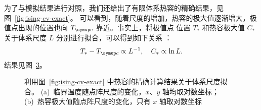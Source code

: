 为了与模拟结果进行对照，我们还给出了有限体系热容的精确结果，见图~\ref{fig:ising-cv-exact}。
可以看到，随着尺度的增加，热容的极大值逐渐增大，极值点出现的位置也向 $\Tc$ 靠近。事实上，将极值点
位置 $T_*$ 和热容极大值 $C_*$ 关于体系尺度 $L$ 分别进行拟合，可以得到如下关系 \cite{pathria}：
\begin{equation}
  T_* - \Tc \propto L^{-1} \qc
  C_*       \propto \ln L.
\end{equation}
结果见图~\ref{fig:ising-fit}。

\begin{figure}[htb]
  \begin{subfigure}[b]{0.48\textwidth}
    \hfill
    \label{fig:ising-cv-fit-i}
  \end{subfigure}
  \begin{subfigure}[b]{0.48\textwidth}
    \hfill
    \label{fig:ising-cv-fit-ii}
  \end{subfigure}
  \caption{利用图~\ref{fig:ising-cv-exact} 中热容的精确计算结果关于体系尺度拟合。
    (a)~临界温度随点阵尺度的变化，$x$、$y$ 轴均取对数坐标；
    (b)~热容极大值随点阵尺度的变化，只有 $x$ 轴取对数坐标}
  \label{fig:ising-fit}
\end{figure}
